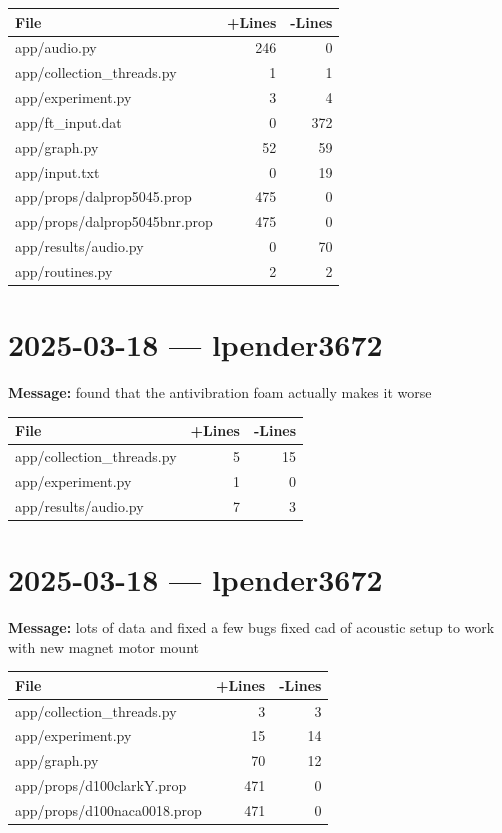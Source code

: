 \documentclass{article}
\begin{document}
\begin{longtable}{|p{10cm}|r|r|}
\hline \textbf{File} & \textbf{+Lines} & \textbf{-Lines} \\
\hline
app/audio.py & 246 & 0 \\
\hline
app/collection\_threads.py & 1 & 1 \\
\hline
app/experiment.py & 3 & 4 \\
\hline
app/ft\_input.dat & 0 & 372 \\
\hline
app/graph.py & 52 & 59 \\
\hline
app/input.txt & 0 & 19 \\
\hline
app/props/dalprop5045.prop & 475 & 0 \\
\hline
app/props/dalprop5045bnr.prop & 475 & 0 \\
\hline
app/results/audio.py & 0 & 70 \\
\hline
app/routines.py & 2 & 2 \\
\hline
\end{longtable}

\section*{2025-03-18 --- lpender3672}
\textbf{Message:} found that the antivibration foam actually makes it worse

\begin{longtable}{|p{10cm}|r|r|}
\hline \textbf{File} & \textbf{+Lines} & \textbf{-Lines} \\
\hline
app/collection\_threads.py & 5 & 15 \\
\hline
app/experiment.py & 1 & 0 \\
\hline
app/results/audio.py & 7 & 3 \\
\hline
\end{longtable}

\section*{2025-03-18 --- lpender3672}
\textbf{Message:} lots of data and fixed a few bugs fixed cad of acoustic setup to work with new magnet motor mount

\begin{longtable}{|p{10cm}|r|r|}
\hline \textbf{File} & \textbf{+Lines} & \textbf{-Lines} \\
\hline
app/collection\_threads.py & 3 & 3 \\
\hline
app/experiment.py & 15 & 14 \\
\hline
app/graph.py & 70 & 12 \\
\hline
app/props/d100clarkY.prop & 471 & 0 \\
\hline
app/props/d100naca0018.prop & 471 & 0 \\
\hline
\end{longtable}
\end{document}
